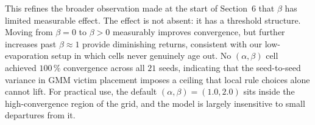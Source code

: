 This refines the broader observation made at the start of Section~6 that
$\beta$ has limited measurable effect. The effect is not absent: it has a
threshold structure. Moving from $\beta = 0$ to $\beta > 0$ measurably
improves convergence, but further increases past $\beta \approx 1$ provide
diminishing returns, consistent with our low-evaporation setup in which cells
never genuinely age out. No $(\alpha, \beta)$ cell achieved $100\,\%$
convergence across all $21$ seeds, indicating that the seed-to-seed variance
in GMM victim placement imposes a ceiling that local rule choices alone
cannot lift. For practical use, the default $(\alpha, \beta) = (1.0, 2.0)$
sits inside the high-convergence region of the grid, and the model is
largely insensitive to small departures from it.

